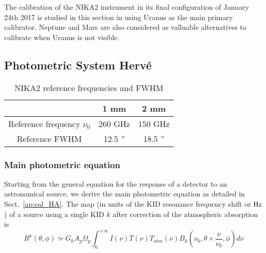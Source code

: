 %





The calibration of the NIKA2 instrument in its final configuration of
January 24th 2017 is studied in this section in using Uranus as the
main primary calibrator. Neptune and Mars are also considered as
valluable alternatives to calibrate when Uranus is not visible.

\subsection{Photometric System {\color{blue} Herv\'e}}
\label{se:cal_HA}

\begin{table}[h]
\begin{center}
\begin{tabular}{|c|c|c|}
\hline
     & 1 mm & 2 mm \\
\hline
Reference frequency $\nu_{0}$ & 260 GHz & 150 GHz \\
\hline
Reference FWHM                      & 12.5  '' & 18.5 '' \\
\hline
\end{tabular}
\caption{NIKA2 reference frequencies and FWHM}
\end{center}
\label{tab:definitions}
\end{table}

\subsubsection{Main photometric equation}

Starting from the general equation for the response of a detector to
an astronomical source, we derive the main photometric equation as
detailed in Sect.~\ref{ap:cal_HA}.
The map (in units of the KID resonance frequency shift or $\rm Hz$) of a source using a single KID $k$
after correction of the atmospheric absorption is
\begin{equation}
R^{k}(\theta, \phi) \simeq G_{k}  A_{p}\Omega_{p} \int_{0}^{+\infty} I(\nu)
T(\nu) T_{atm}(\nu) B_{k}(\nu_{0}, \theta \times \frac{\nu}{\nu_{0}},
\phi) d\nu 
\label{eq:mainphot}
\end{equation}

